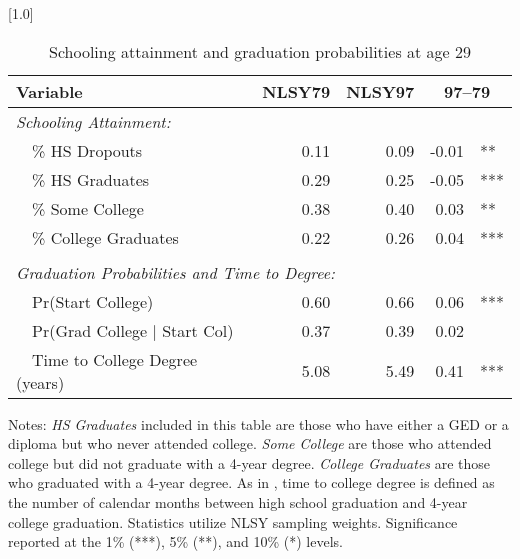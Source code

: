 \begin{table}[ht]
\caption{Schooling attainment and graduation probabilities at age 29}
\label{tab:degree}
\centering
\scalebox{1.0}[1.0]{%
\begin{threeparttable}
\begin{tabular}{lrrr@{}l}
\toprule 
Variable & NLSY79 & NLSY97 & \multicolumn{2}{c}{97--79} \\
\midrule 
\multicolumn{5}{l}{\emph{Schooling Attainment:}} \\
~~\% HS Dropouts                      & 0.11 & 0.09 & -0.01 &    ** \\ 
~~\% HS Graduates                     & 0.29 & 0.25 & -0.05 &   *** \\ 
~~\% Some College                     & 0.38 & 0.40 & 0.03 &    ** \\ 
~~\% College Graduates                & 0.22 & 0.26 & 0.04 &   *** \\ 
\vspace{-6pt}  \\
\multicolumn{5}{l}{\emph{Graduation Probabilities and Time to Degree:}} \\
~~Pr(Start College)                   & 0.60 & 0.66 & 0.06 &     *** \\ 
~~Pr(Grad College $\vert$ Start Col)  & 0.37 & 0.39 & 0.02 &    \\ 
~~Time to College Degree (years)      & 5.08 & 5.49 & 0.41 &   *** \\ 
\bottomrule 
\end{tabular} 
\footnotesize{Notes: \emph{HS Graduates} included in this table are those who have either a GED or a diploma but who never attended college. \emph{Some College} are those who attended college but did not graduate with a 4-year degree. \emph{College Graduates} are those who graduated with a 4-year degree. As in \citet{bound2012}, time to college degree is defined as the number of calendar months between high school graduation and 4-year college graduation. Statistics utilize NLSY sampling weights. Significance reported at the 1\% (***), 5\% (**), and 10\% (*) levels.}
\end{threeparttable} 
} 
\end{table} 
